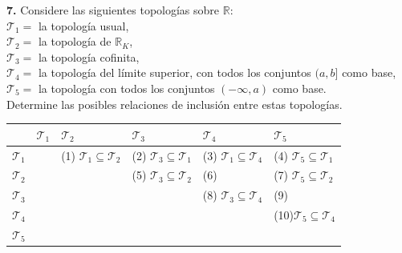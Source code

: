 \documentclass{article}
\newcommand{\xmark}{\ding{55}}
\begin{document}
\begin{mybox}
	\textbf{7. } Considere las siguientes topologías sobre $\mathbb{R}:$ \\
	
	$ \mathcal{T}_{1} = $ la topología usual, \\
	$\mathcal{T}_{2} = $ la topología de $\mathbb{R}_{K}$, \\
	$\mathcal{T}_{3} = $ la topología cofinita, \\
	$\mathcal{T}_{4} = $ la topología del límite superior, con todos los conjuntos $(a, b ]$ como base, \\
	$\mathcal{T}_{5} = $ la topología con todos los conjuntos $(- \infty, a)$ como base.  \\
	
	Determine las posibles relaciones de inclusión entre estas topologías. 
\end{mybox}	
 \begin{table}[h]
 	\begin{tabularx}{\textwidth}{|X|X|X|X|X|X|}
 		\hline
 		&$\mathcal{T}_{1}$   &$\mathcal{T}_{2}$ & $\mathcal{T}_{3}$ & $\mathcal{T}_{4}$ & $\mathcal{T}_{5}$ \\ \hline
 		
 		$\mathcal{T}_{1}$ &  \cellcolor{blue!25} &(1) $\mathcal{T}_{1} \subseteq \mathcal{T}_{2}$ &(2) $\mathcal{T}_{3} \subseteq \mathcal{T}_{1}$  &(3) $\mathcal{T}_{1} \subseteq \mathcal{T}_{4}$ &(4) $\mathcal{T}_{5} \subseteq \mathcal{T}_{1}$ \\ \hline
 		
 		$\mathcal{T}_{2}$ &  &  \cellcolor{blue!25} &(5) $\mathcal{T}_{3} \subseteq \mathcal{T}_{2}$  &(6) \hspace{0.2cm} \textcolor{red}{\xmark} &(7) $\mathcal{T}_{5} \subseteq \mathcal{T}_{2}$ \\ \hline
 		
 		$\mathcal{T}_{3}$ &  &  & \cellcolor{blue!25} &(8) $\mathcal{T}_{3} \subseteq \mathcal{T}_{4}$ &(9) \hspace{0.2cm} \textcolor{red}{\xmark} \\ \hline
 		
 		$\mathcal{T}_{4}$ &  &  &  & \cellcolor{blue!25} &(10)$\mathcal{T}_{5} \subseteq \mathcal{T}_{4}$ \\ \hline
 		
 		$\mathcal{T}_{5}$ &  &  &  &  & \cellcolor{blue!25} \\ \hline
 		
 		\end{tabularx}
 \end{table}
\end{document}
